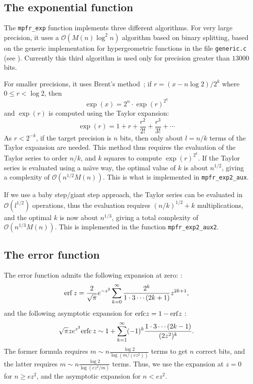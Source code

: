 \documentclass[12pt]{amsart}
\def\O{{\mathcal O}}
\begin{document}
\subsection{The exponential function}

The {\tt mpfr\_exp} function implements three different algorithms.
For very large precision, it uses a $\O(M(n) \log^2 n)$ algorithm
based on binary splitting, based on the generic implementation for
hypergeometric functions in the file {\tt generic.c} (see \cite{Jeandel00}).
Currently this third algorithm is used only for precision greater
than $13000$ bits.

For smaller precisions, it uses Brent's method~;
if $r = (x - n \log 2)/2^k$ where $0 \le r < \log 2$, then 
\[ \exp(x) = 2^n \cdot \exp(r)^{2^k} \]
and $\exp(r)$ is computed using the Taylor expansion:
\[ \exp(r) =  1 + r + \frac{r^2}{2!} + \frac{r^3}{3!} + \cdots \]
As $r < 2^{-k}$, if the target precision is $n$ bits, then only
about $l = n/k$ terms of the Taylor expansion are needed.
This method thus requires the evaluation of the Taylor series to
order $n/k$, and $k$ squares to compute $\exp(r)^{2^k}$.
If the Taylor series is evaluated using a na\"{\i}ve way, the optimal
value of $k$ is about $n^{1/2}$, giving a complexity of $\O(n^{1/2} M(n))$.
This is what is implemented in {\tt mpfr\_exp2\_aux}.

If we use a baby step/giant step approach, the Taylor series
can be evaluated in $\O(l^{1/2})$ operations, 
thus the evaluation requires $(n/k)^{1/2} + k$ multiplications,
and the optimal $k$ is now about $n^{1/3}$,
giving a total complexity of $\O(n^{1/3} M(n))$.
This is implemented in the function {\tt mpfr\_exp2\_aux2}.

\subsection{The error function}

The error function admits the following expansion at zero:
\cite[formula 7.1.6]{AbSt73}:
\[ {\rm erf} \, z = \frac{2}{\sqrt{\pi}} e^{-z^2}
        \sum_{k=0}^{\infty} \frac{2^k}{1 \cdot 3 \cdots (2k+1)} z^{2k+1}, \]
and the following asymptotic expansion for ${\rm erfc} z = 1 - {\rm erf} z$
\cite[formula 7.1.23]{AbSt73}:
\[ \sqrt{\pi} z e^{z^2} {\rm erfc} \, z \sim 1 +
        \sum_{k=1}^{\infty} (-1)^k \frac{1 \cdot 3 \cdots (2k-1)}{(2z^2)^k}. \]
The former formula requires $m \sim n \frac{\log 2}{\log(m/(ez^2))}$ terms
to get $n$ correct bits, and the latter requires
$m \sim n \frac{\log 2}{\log(ez^2/m)}$ terms.
Thus, we use the expansion at $z=0$ for $n \ge e z^2$, and the asymptotic
expansion for $n < e z^2$.
\end{document}
